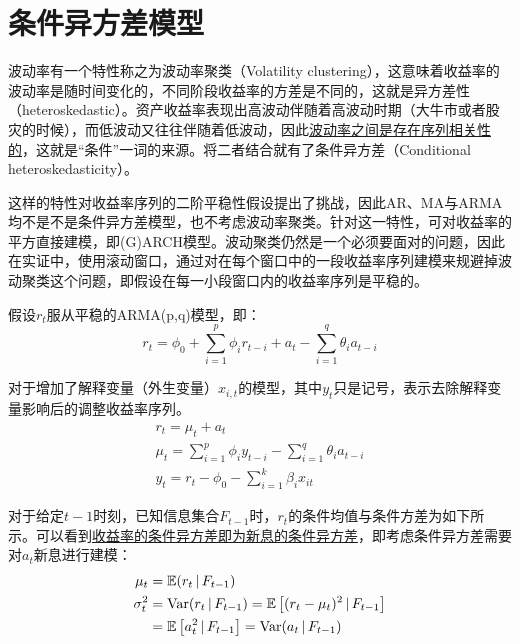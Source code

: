 \documentclass[11pt]{article}
\begin{document}
\section{条件异方差模型}

波动率有一个特性称之为波动率聚类（Volatility clustering），这意味着收益率的波动率是随时间变化的，不同阶段收益率的方差是不同的，这就是异方差性（heteroskedastic）。资产收益率表现出高波动伴随着高波动时期（大牛市或者股灾的时候），而低波动又往往伴随着低波动，因此\uline{波动率之间是存在序列相关性的}，这就是“条件”一词的来源。将二者结合就有了条件异方差（Conditional heteroskedasticity）。

这样的特性对收益率序列的二阶平稳性假设提出了挑战，因此AR、MA与ARMA均不是不是条件异方差模型，也不考虑波动率聚类。针对这一特性，可对收益率的平方直接建模，即(G)ARCH模型。波动聚类仍然是一个必须要面对的问题，因此在实证中，使用滚动窗口，通过对在每个窗口中的一段收益率序列建模来规避掉波动聚类这个问题，即假设在每一小段窗口内的收益率序列是平稳的。

假设$r_t$服从平稳的ARMA(p,q)模型，即：
\begin{equation*}
    r_t = \phi_0 + \sum_{i=1}^{p} \phi_i r_{t-i} + a_t - \sum_{i=1}^{q} \theta_i a_{t-i}
\end{equation*}

对于增加了解释变量（外生变量）$x_{i,t}$的模型，其中$y_t$只是记号，表示去除解释变量影响后的调整收益率序列。
\begin{gather*}
    r_t=\mu_t + a_t \\
    \mu_t = \sum_{i=1}^{p} \phi_i y_{t-i} - \sum_{i=1}^{q} \theta_i a_{t-i} \\
    y_t = r_t - \phi_0 - \sum_{i=1}^{k} \beta_i x_{it}
\end{gather*}

对于给定$t-1$时刻，已知信息集合$F_{t-1}$时，$r_t$的条件均值与条件方差为如下所示。可以看到\uline{收益率的条件异方差即为新息的条件异方差}，即考虑条件异方差需要对$a_t$新息进行建模：
\begin{align*}
    \mu_t &= \mathbb{E}(r_t \,\vert\, F_{t-1}) \\
    \sigma_{t}^{2} &= \operatorname{Var}(r_t \,\vert\, F_{t-1})
    = \mathbb{E} \left[ (r_t - \mu_t)^2 \,\vert\, F_{t-1} \right] \\
    &= \mathbb{E} \left[ a_{t}^{2} \,\vert\, F_{t-1} \right]
    = \operatorname{Var}(a_t \,\vert\, F_{t-1})
\end{align*}

\end{document}
